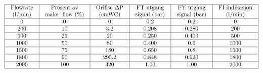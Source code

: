 $$\vbox{\offinterlineskip
\halign{\strut
\vrule \quad\hfil # \ \hfil &
\vrule \quad\hfil # \ \hfil &
\vrule \quad\hfil # \ \hfil &
\vrule \quad\hfil # \ \hfil &
\vrule \quad\hfil # \ \hfil &
\vrule \quad\hfil # \ \hfil \vrule \cr
\noalign{\hrule}
%
Flowrate & Prosent av & Orifise $\Delta$P & FT utgang & FY utgang & FI indikasjon \cr
%
(l/min) & maks. flow (\%) & (cmWC) & signal (bar) & signal (bar) & (l/min) \cr
%
\noalign{\hrule}
%
0 & 0 & 0 & 0.2 & 0.2 & 0 \cr
%
\noalign{\hrule}
%
200 & 10 & 3.2 & 0.208 & 0.280 & 200 \cr
%
\noalign{\hrule}
%
500 & 25 & 20 & 0.250 & 0.400 & 500 \cr
%
\noalign{\hrule}
%
1000 & 50 & 80 & 0.400 & 0.6 & 1000 \cr
%
\noalign{\hrule}
%
1500 & 75 & 180 & 0.650 & 0.8 & 1500 \cr
%
\noalign{\hrule}
%
1800 & 90 & 295.2 & 0.848 & 0.920 & 1800 \cr
%
\noalign{\hrule}
%
2000 & 100 & 320 & 1.00 & 1.00 & 2000 \cr
%
\noalign{\hrule}
} %
}$$ %









